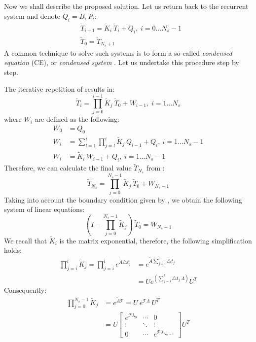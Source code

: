 Now we shall describe the proposed solution. Let us return back to the recurrent system and denote $Q_i = \tilde{B}_i \: P_i$:
\begin{align}
  & \tilde{T}_{i + 1} = \tilde{K}_i \: \tilde{T}_i + Q_i, \; i = 0 \dots N_s - 1 \label{eq:ce-recurrent} \\
  & \tilde{T}_0 = \tilde{T}_{N_s + 1} \nonumber
\end{align}
A common technique to solve such systems is to form a so-called \emph{condensed equation} (CE), or \emph{condensed system} \cite{stoer2002}. Let us undertake this procedure step by step.

The iterative repetition of  results in:
\begin{equation} \label{eq:y-recurrent}
  \tilde{T}_i = \prod_{j = 0}^{i - 1} \tilde{K}_j \: \tilde{T}_0 + W_{i - 1}, \; i = 1 \dots N_s
\end{equation}
where $W_i$ are defined as the following:
\begin{align}
  W_0 & = Q_0 \nonumber \\
  W_i & = \sum_{l = 1}^i \prod_{j = l}^i \tilde{K}_j \: Q_{l - 1} + Q_i, \: i = 1 \dots N_s - 1 \nonumber \\
  W_i & = \tilde{K}_i \: W_{i - 1} + Q_i, \; i = 1 \dots N_s - 1 \label{eq:p-recurrent}
\end{align}
Therefore, we can calculate the final value $\tilde{T}_{N_s}$ from :
\[
  \tilde{T}_{N_s} = \prod_{j = 0}^{N_s - 1} \tilde{K}_j \: \tilde{T}_0 + W_{N_s - 1}
\]
Taking into account the boundary condition given by , we obtain the following system of linear equations:
\begin{equation} \label{eq:core-system}
  (I - \prod_{j = 0}^{N_s - 1} \tilde{K}_j) \: \tilde{T}_0 = W_{N_s - 1}
\end{equation}
We recall that $\tilde{K}_i$ is the matrix exponential, therefore, the following simplification holds:
\begin{align*}
  \prod_{j = i}^l \tilde{K}_j = \prod_{j = i}^l e^{\tilde{A} \triangle t_j} & = e^{\tilde{A} \sum_{j = i}^l \triangle t_j} \\
  & = U e^{\left( \sum_{j = i}^l \triangle t_j \: \Lambda \right)} U^T
\end{align*}
Consequently:
\begin{align*}
  \prod_{j = 0}^{N_s - 1} \tilde{K}_j & = e^{\tilde{A} \mathcal{T}} = U \: e^{\mathcal{T} \Lambda} \: U^T \\
    & = U \left[
      \begin{array}{ccc}
        e^{\mathcal{T} \lambda_0} & \cdots & 0 \\
        \vdots & \ddots & \vdots \\
        0 & \cdots & e^{\mathcal{T} \lambda_{N_n - 1}}
      \end{array}
    \right] U^T
\end{align*}
